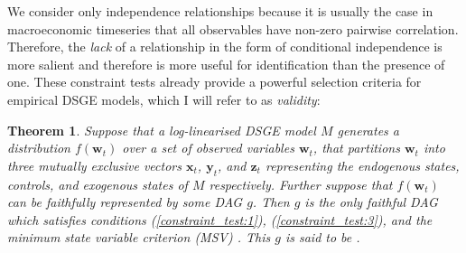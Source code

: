 \documentclass{article}
\newtheorem{theorem}{Theorem}
\begin{document}
We consider only independence relationships because it is usually the case in macroeconomic timeseries that all observables have non-zero pairwise correlation. Therefore, the \textit{lack} of a relationship in the form of conditional independence is more salient and therefore is more useful for identification than the presence of one. These constraint tests already provide a powerful selection criteria for empirical DSGE models, which I will refer to as \textit{validity}:

\theoremstyle{theorem}
\begin{theorem}
  Suppose that a log-linearised DSGE model $M$ generates a distribution $f(\mathbf{w}_t)$ over a set of observed variables $\mathbf{w}_t$, that partitions $\mathbf{w}_t$ into three mutually exclusive vectors $\mathbf{x}_t$, $\mathbf{y}_t$, and $\mathbf{z}_t$ representing the endogenous states, controls, and exogenous states of $M$ respectively. Further suppose that $f(\mathbf{w}_t)$ can be \textit{faithfully} represented by some DAG $g$. Then $g$ is the only faithful DAG which satisfies conditions (\ref{constraint_test:1}), (\ref{constraint_test:3}), and the minimum state variable criterion (MSV) \parencite{mccallum1999role}. This $g$ is said to be .
  \label{validity}
\end{theorem}
\end{document}
